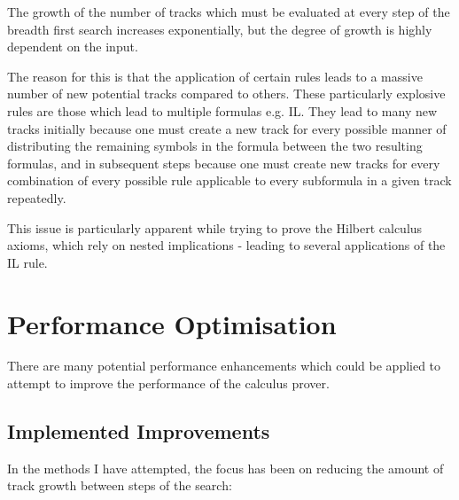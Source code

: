 \documentclass{article}
\begin{document}
The growth of the number of tracks which must be evaluated at every step of the 
breadth first search increases exponentially, but the degree of growth is highly 
dependent on the input. 

The reason for this is that the application of certain rules leads to a massive
number of new potential tracks compared to others. These particularly explosive
rules are those which lead to multiple formulas e.g. IL. They lead to many new
tracks initially because one must create a new track for every possible manner
of distributing the remaining symbols in the formula between the two resulting
formulas, and in subsequent steps because one must create new tracks for every
combination of every possible rule applicable to every subformula in a given
track repeatedly.

This issue is particularly apparent while trying to prove the Hilbert calculus
axioms, which rely on nested implications - leading to several applications of
the IL rule.

\section{Performance Optimisation}

There are many potential performance enhancements which could be
applied to attempt to improve the performance of the calculus prover. 

\subsection{Implemented Improvements}

In the
methods I have attempted, the focus has been on reducing the amount of track
growth between steps of the search:
\end{document}
